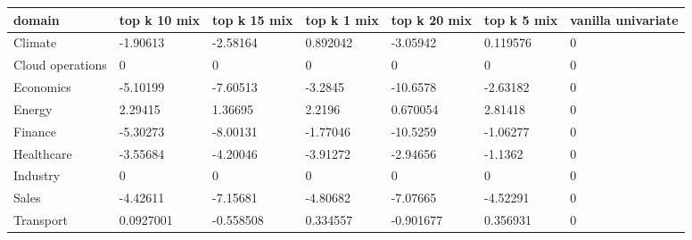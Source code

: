 \begin{tabular}{lllllll}
\toprule
domain & top k 10 mix & top k 15 mix & top k 1 mix & top k 20 mix & top k 5 mix & vanilla univariate \\
\midrule
Climate & -1.90613 & -2.58164 & 0.892042 & -3.05942 & 0.119576 & 0 \\
Cloud operations & 0 & 0 & 0 & 0 & 0 & 0 \\
Economics & -5.10199 & -7.60513 & -3.2845 & -10.6578 & -2.63182 & 0 \\
Energy & 2.29415 & 1.36695 & 2.2196 & 0.670054 & 2.81418 & 0 \\
Finance & -5.30273 & -8.00131 & -1.77046 & -10.5259 & -1.06277 & 0 \\
Healthcare & -3.55684 & -4.20046 & -3.91272 & -2.94656 & -1.1362 & 0 \\
Industry & 0 & 0 & 0 & 0 & 0 & 0 \\
Sales & -4.42611 & -7.15681 & -4.80682 & -7.07665 & -4.52291 & 0 \\
Transport & 0.0927001 & -0.558508 & 0.334557 & -0.901677 & 0.356931 & 0 \\
\bottomrule
\end{tabular}
